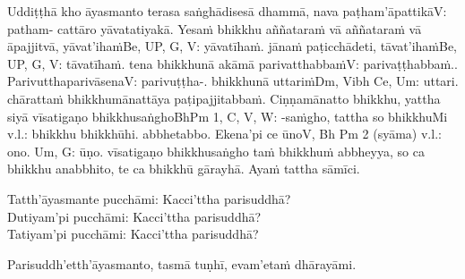 \begin{center}
	Uddiṭṭhā kho āyasmanto terasa saṅghādisesā dhammā, nava paṭham'āpattikā\makeatletter\hyperlink{endnote-appendix}\makeatother V: patham- cattāro yāvatatiyakā. Yesaṁ bhikkhu aññataraṁ vā aññataraṁ vā āpajjitvā, yāvat'ihaṁ\makeatletter\hyperlink{endnote-appendix}\makeatother Be, UP, G, V: yāvatīhaṁ. jānaṁ paṭicchādeti, tāvat'ihaṁ\makeatletter\hyperlink{endnote-appendix}\makeatother Be, UP, G, V: tāvatīhaṁ. tena bhikkhunā akāmā parivatthabbaṁ\makeatletter\hyperlink{endnote-appendix}\makeatother V: parivaṭṭhabbaṁ.. Parivutthaparivāsena\makeatletter\hyperlink{endnote-appendix}\makeatother V: parivuṭṭha-. bhikkhunā uttariṁ\makeatletter\hyperlink{endnote-appendix}\makeatother Dm, Vibh Ce, Um: uttari. chārattaṁ bhikkhumānattāya paṭipajjitabbaṁ. Ciṇṇamānatto bhikkhu, yattha siyā vīsatigaṇo bhikkhusaṅgho\makeatletter\hyperlink{endnote-appendix}\makeatother BhPm 1, C, V, W: -saṁgho, tattha so bhikkhu\makeatletter\hyperlink{endnote-appendix}\makeatother Mi v.l.: bhikkhu bhikkhūhi. abbhetabbo. Ekena'pi ce ūno\makeatletter\hyperlink{endnote-appendix}\makeatother V, Bh Pm 2 (syāma) v.l.: ono. Um, G: ūṇo. vīsatigaṇo bhikkhusaṅgho taṁ bhikkhuṁ abbheyya, so ca bhikkhu anabbhito, te ca bhikkhū gārayhā. Ayaṁ tattha sāmīci.

	\smallskip

	Tatth'āyasmante pucchāmi: Kacci'ttha parisuddhā?\\
	Dutiyam'pi pucchāmi: Kacci'ttha parisuddhā?\\
	Tatiyam'pi pucchāmi: Kacci'ttha parisuddhā?

	\smallskip

	Parisuddh'etth'āyasmanto, tasmā tuṇhī, evam'etaṁ dhārayāmi.
\end{center}

